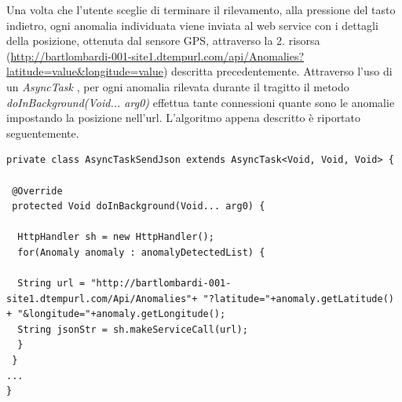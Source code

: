 \documentclass[a4paper, 11pt]{article} %
\begin{document}
Una volta che l'utente sceglie di terminare il rilevamento, alla pressione del tasto indietro, ogni anomalia individuata viene inviata al web service con i dettagli della posizione, ottenuta dal sensore GPS, attraverso la 2. risorsa (\url{http://bartlombardi-001-site1.dtempurl.com/api/Anomalies?latitude=value\&longitude=value}) descritta precedentemente.
Attraverso l'uso di un \textit{AsyncTask} , per ogni anomalia rilevata durante il tragitto il metodo \textit{doInBackground(Void... arg0)} effettua tante connessioni quante sono le anomalie impostando la posizione nell'url. L'algoritmo appena descritto è riportato seguentemente.\\

\begin{lstlisting}
private class AsyncTaskSendJson extends AsyncTask<Void, Void, Void> {

 @Override
 protected Void doInBackground(Void... arg0) {

  HttpHandler sh = new HttpHandler();
  for(Anomaly anomaly : anomalyDetectedList) {

  String url = "http://bartlombardi-001-site1.dtempurl.com/Api/Anomalies"+ "?latitude="+anomaly.getLatitude() + "&longitude="+anomaly.getLongitude();
  String jsonStr = sh.makeServiceCall(url);
  }  
 }
...
}
\end{lstlisting}
\newpage
\end{document}
